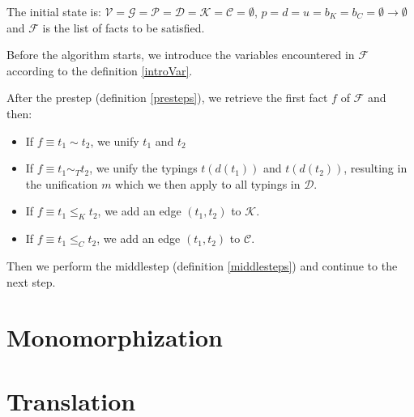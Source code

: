 \begin{defn}
    The initial state is: $\mathcal{V} = \mathcal{G} = \mathcal{P} = \mathcal{D} = \mathcal{K} = \mathcal{C} = \emptyset$, $p = d = u = b_K = b_C = \emptyset \to \emptyset$ and $\mathcal{F}$ is the list of facts to be satisfied.

    Before the algorithm starts, we introduce the variables encountered in $\mathcal{F}$ according to the definition \ref{introVar}.
\end{defn}

\begin{defn}
    After the prestep (definition \ref{presteps}), we retrieve the first fact $f$ of $\mathcal{F}$ and then:

    \begin{itemize}
        \item If $f \equiv t_1 \sim t_2$, we unify $t_1$ and $t_2$
        \item If $f \equiv t_1 \sim_T t_2$, we unify the typings $t (d (t_1))$ and $t (d (t_2))$, resulting in the unification $m$ which we then apply to all typings in $\mathcal{D}$.
        \item If $f \equiv t_1 \leq_K t_2$, we add an edge $(t_1, t_2)$ to $\mathcal{K}$.
        \item If $f \equiv t_1 \leq_C t_2$, we add an edge $(t_1, t_2)$ to $\mathcal{C}$.
    \end{itemize}

    Then we perform the middlestep (definition \ref{middlesteps}) and continue to the next step.
\end{defn}

\section{Monomorphization}

\section{Translation}
